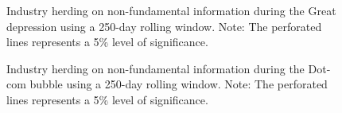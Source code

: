 \documentclass[
  letterpaper,
  DIV=11,
  numbers=noendperiod]{scrartcl}
\begin{document}
\begin{figure}[H]


\caption{\label{fig-rol_nonfundamental_gd}Industry herding on
non-fundamental information during the Great depression using a 250-day
rolling window. Note: The perforated lines represents a 5\% level of
significance.}

\end{figure}%

\begin{figure}[H]


\caption{\label{fig-rol_nonfundamental_db}Industry herding on
non-fundamental information during the Dot-com bubble using a 250-day
rolling window. Note: The perforated lines represents a 5\% level of
significance.}

\end{figure}%
\end{document}
